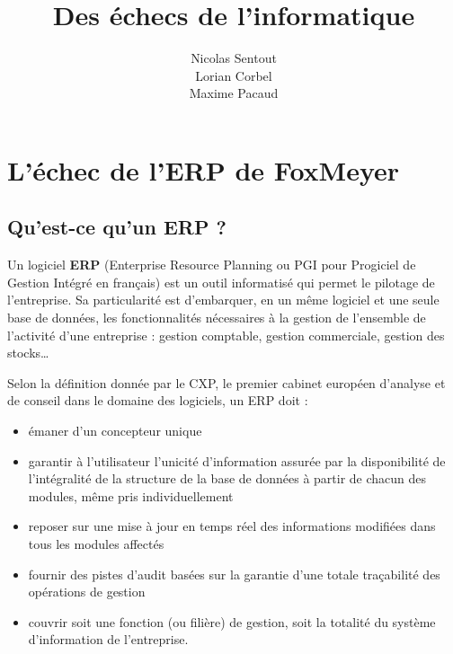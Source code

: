 \documentclass[12pt]{report}
\title{Des échecs de l'informatique}
\author{Nicolas Sentout  \\ Lorian Corbel \\ Maxime Pacaud}
\begin{document}
\maketitle
\tableofcontents

\chapter{L'échec de l'ERP de FoxMeyer}

\section{Qu'est-ce qu'un ERP ?}

Un logiciel \textbf{ERP} (Enterprise Resource Planning ou PGI pour Progiciel de Gestion Intégré en français) est un outil informatisé qui permet le pilotage de l’entreprise. Sa particularité est d’embarquer, en un même logiciel et une seule base de données, les fonctionnalités nécessaires à la gestion de l’ensemble de l’activité d’une entreprise : gestion comptable, gestion commerciale, gestion des stocks…

Selon la définition donnée par le CXP, le premier cabinet européen d’analyse et de conseil dans le domaine des logiciels, un ERP doit :
\begin{itemize}
\item émaner d'un concepteur unique
\item garantir à l'utilisateur l'unicité d'information assurée par la disponibilité de l'intégralité de la structure de la base de données à partir de chacun des modules, même pris individuellement
\item reposer sur une mise à jour en temps réel des informations modifiées dans tous les modules affectés
\item fournir des pistes d'audit basées sur la garantie d'une totale traçabilité des opérations de gestion
\item couvrir soit une fonction (ou filière) de gestion, soit la totalité du système d'information de l'entreprise\cite{divaltoerp}.
\end{itemize}
\end{document}
